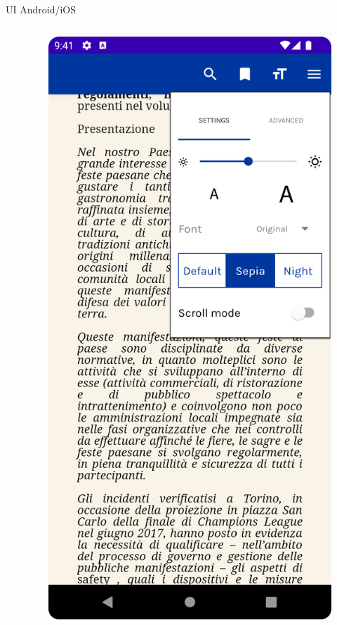 \begin{frame}{UI Android/iOS}
\begin{columns}[onlytextwidth]
\begin{column}{0.14\textwidth}
        \end{column}
        \begin{column}{0.14\textwidth}
        
            \begin{figure}[H]
                \includegraphics[width=1\textwidth]{img/reader_settings.png}
            \end{figure}
            

\end{column}
\end{columns}
\end{frame}
